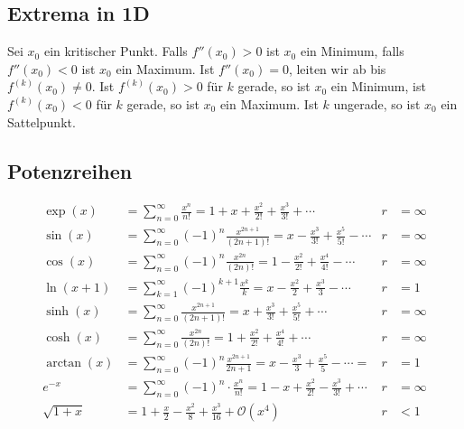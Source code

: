 \documentclass[a4paper,10pt]{article}
\def\sumk{\sum_{k=1}^\infty}
\def\sumn{\sum_{n=0}^\infty}
\begin{document}
\subsection{Extrema in 1D}

Sei $x_0$ ein kritischer Punkt. Falls $f''(x_0) > 0$ ist $x_0$ ein Minimum, falls $f''(x_0) < 0$ ist $x_0$ ein Maximum. Ist $f''(x_0) = 0$, leiten wir ab bis $f^{(k)}(x_0) \neq 0$. Ist $f^{(k)}(x_0) > 0$ für $k$ gerade, so ist $x_0$ ein Minimum, ist $f^{(k)}(x_0) < 0$ für $k$ gerade, so ist $x_0$ ein Maximum. Ist $k$ ungerade, so ist $x_0$ ein Sattelpunkt.

\subsection{Potenzreihen}
\begin{align*}
\exp(x) &= \sumn \frac{x^n}{n!} = 1 + x + \frac{x^2}{2!} + \frac{x^3}{3!} + \cdots & r &= \infty \\
\sin(x) &= \sumn (-1)^n \frac{x^{2n + 1}}{(2n + 1)!} = x - \frac{x^3}{3!} + \frac{x^5}{5!} - \cdots & r &= \infty \\
\cos(x) &= \sumn (-1)^n \frac{x^{2n}}{(2n)!} = 1 - \frac{x^2}{2!} + \frac{x^4}{4!} - \cdots & r &= \infty \\
\ln(x + 1) &= \sumk (-1)^{k+1} \frac{x^k}{k} = x - \frac{x^2}{2} + \frac{x^3}{3} - \cdots & r &= 1 \\
\sinh(x) &= \sumn \frac{x^{2n+1}}{(2n+1)!} = x + \frac{x^3}{3!} + \frac{x^5}{5!} + \cdots & r &= \infty \\
\cosh(x) &= \sumn \frac{x^{2n}}{(2n)!} = 1 + \frac{x^2}{2!} + \frac{x^4}{4!} + \cdots & r &= \infty \\
\arctan(x) &= \sumn (-1)^n \frac{x^{2n+1}}{2n+1} = x - \frac{x^3}{3} + \frac{x^5}{5} - \cdots =  & r &= 1 \\
e^{-x} &= \sumn (-1)^n \cdot \frac{x^n}{n!} = 1 - x + \frac{x^2}{2!} - \frac{x^3}{3!} + \cdots & r &= \infty \\
\sqrt{1+x} &= 1 + \frac{x}{2} - \frac{x^2}{8} + \frac{x^3}{16} + \mathcal{O}(x^4) & r &< 1 \\
\end{align*}
\end{document}
